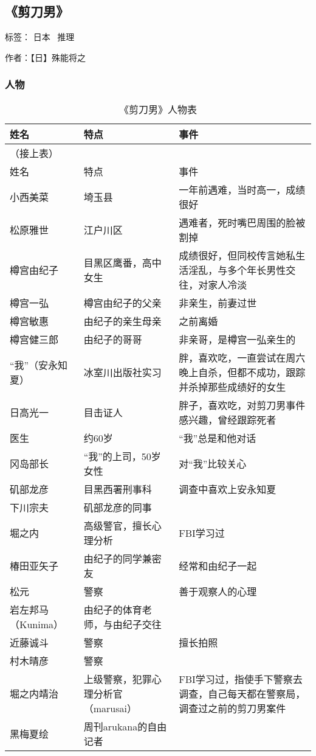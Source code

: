 \subsection{《剪刀男》}

标签： 日本 \ 推理

作者：【日】殊能将之

\subsubsection{人物}

\begin{longtable}{p{} | p{} | p{}}

    \caption{《剪刀男》人物表} \\
    \hline
姓名 & 特点 & 事件 \\
\hline
\endfirsthead

（接上表） \\
姓名 & 特点 & 事件 \\
\hline
\endhead

\hline
\endfoot

小西美菜 & 埼玉县 & 一年前遇难，当时高一，成绩很好 \\
松原雅世 & 江户川区 & 遇难者，死时嘴巴周围的脸被割掉 \\
樽宫由纪子 & 目黑区鹰番，高中女生 & 成绩很好，但同校传言她私生活淫乱，与多个年长男性交往，对家人冷淡 \\
樽宫一弘 & 樽宫由纪子的父亲 & 非亲生，前妻过世 \\
樽宫敏惠 & 由纪子的亲生母亲 & 之前离婚 \\
樽宫健三郎 & 由纪子的哥哥 & 非亲哥，是樽宫一弘亲生的 \\
“我”（安永知夏） & 冰室川出版社实习 & 胖，喜欢吃，一直尝试在周六晚上自杀，但都不成功，跟踪并杀掉那些成绩好的女生 \\
日高光一 & 目击证人 & 胖子，喜欢吃，对剪刀男事件感兴趣，曾经跟踪死者 \\
医生 & 约60岁 & “我”总是和他对话 \\
冈岛部长 & “我”的上司，50岁女性 & 对“我”比较关心 \\
矶部龙彦 & 目黑西署刑事科 & 调查中喜欢上安永知夏 \\
下川宗夫 & 矶部龙彦的同事 & \\
堀之内 & 高级警官，擅长心理分析 & FBI学习过 \\
椿田亚矢子 & 由纪子的同学兼密友 & 经常和由纪子一起 \\
松元 & 警察 & 善于观察人的心理 \\
岩左邦马（Kunima） & 由纪子的体育老师，与由纪子交往 & \\ 
近藤诚斗 & 警察 & 擅长拍照 \\
村木晴彦 & 警察 & \\
堀之内靖治 & 上级警察，犯罪心理分析官（marusai） & FBI学习过，指使手下警察去调查，自己每天都在警察局，调查过之前的剪刀男案件 \\
黑梅夏绘 & 周刊arukana的自由记者 & \\
\end{longtable}

